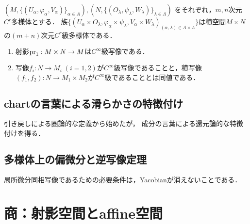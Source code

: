 \documentclass[uplatex,dvipdfmx]{jsreport}
\begin{document}
\begin{lemma}
    $(M,\{(U_\alpha,\varphi_\alpha,V_\alpha)\}_{\alpha\in A}),(N,\{(O_\lambda,\psi_\lambda,W_\lambda)\}_{\lambda\in\Lambda})$
    をそれぞれ，$m,n$次元$C^r$多様体とする．
    族$\{(U_\alpha\times O_\lambda,\varphi_\alpha\times\psi_\lambda,V_\alpha\times W_\lambda)_{(\alpha,\lambda)\in A\times\Lambda}\}$は積空間$M\times N$の$(m+n)$次元$C^r$級多様体である．
\end{lemma}

\begin{proposition}[product]\mbox{}
    \begin{enumerate}
        \item 射影$\mathrm{pr}_1:M\times N\to M$は$C^\infty$級写像である．
        \item 写像$f_i:N\to M_i\;(i=1,2)$が$C^\infty$級写像であることと，積写像$(f_1,f_2):N\to M_1\times M_2$が$C^\infty$級であることとは同値である．
    \end{enumerate}
\end{proposition}

\subsection{chartの言葉による滑らかさの特徴付け}

\begin{tcolorbox}[colframe=ForestGreen, colback=ForestGreen!10!white,breakable,colbacktitle=ForestGreen!40!white,coltitle=black,fonttitle=\bfseries\sffamily,
title=]
    引き戻しによる圏論的な定義から始めたが，
    成分の言葉による還元論的な特徴付けを得る．
\end{tcolorbox}

\subsection{多様体上の偏微分と逆写像定理}

\begin{tcolorbox}[colframe=ForestGreen, colback=ForestGreen!10!white,breakable,colbacktitle=ForestGreen!40!white,coltitle=black,fonttitle=\bfseries\sffamily,
title=]
    局所微分同相写像であるための必要条件は，Yacobianが消えないことである．
\end{tcolorbox}

\section{商：射影空間とaffine空間}
\end{document}
